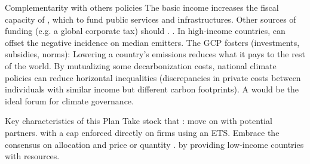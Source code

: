 \documentclass[aspectratio=169,xcolor=dvipsnames, 11pt,mathserif]{beamer}
\begin{document}
\begin{framefont}{\small}
\begin{frame}{Complementarity with others policies}
    \bbsp \ip The basic income increases the fiscal capacity of , which  to fund public services and infrastructures.
    \ip Other sources of funding (e.g. a global corporate tax) should .
    \ip {}.
    \ip In high-income countries,  can offset the negative incidence on median emitters.
    \ip The GCP fosters  (investments, subsidies, norms):
        \bbsp \ip Lowering a country's emissions reduces what it pays to the rest of the world.
        \ip By mutualizing some decarbonization costs, national climate policies can reduce horizontal inequalities (discrepancies in private costs between individuals with similar income but different carbon footprints).
        \ee
    \ip A  would be the ideal forum for climate governance.
    \ee
\end{frame}

\begin{frame}{Key characteristics of this Plan}
\bbsp \ip Take stock that : move on with potential partners.
\ip {} with a cap enforced directly on firms using an ETS.
\ip Embrace the consensus on  allocation and  price or quantity .
\ip {} by providing low-income countries with resources.%
\ee
\end{frame}



\end{framefont}
\end{document}
